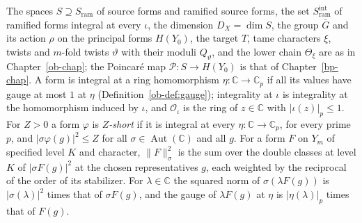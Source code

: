 \documentclass[reqno]{amsart}
\newcounter{chap}
\theoremstyle{definition}
\theoremstyle{plain}
\theoremstyle{definition}
\newcommand{\C}{\mathbb{C}}
\newcommand{\Sram}{S_{\mathrm{ram}}}
\newcommand{\Oc}{\mathcal{O}}
\newcommand{\Gb}{\bar G}
\newcommand{\Aut}{\operatorname{Aut}}
\begin{document}
The spaces \(S \supseteq \Sram\) of source forms and ramified source forms, the set \(\Sram^{\mathrm{int}}\) of ramified forms integral at every \(\iota\), the dimension \(D_X = \dim S\), the group \(\Gb\) and its action \(\rho\) on the principal forms \(H(Y_0)\), the target \(T\), tame characters \(\xi\), twists and \(m\)-fold twists \(\vartheta\) with their moduli \(Q_\vartheta\), and the lower chain \(\Theta_\xi\) are as in Chapter~\ref{ob-chap}; the Poincar\'e map \(\mathcal{P}\colon S \to H(Y_0)\) is that of Chapter~\ref{bp-chap}.  A form is integral at a ring homomorphism \(\eta\colon \C \to \C_p\) if all its values have gauge at most \(1\) at \(\eta\) (Definition~\ref{ob-def:gauge}); integrality at \(\iota\) is integrality at the homomorphism induced by \(\iota\), and \(\Oc_\iota\) is the ring of \(z \in \C\) with \(\lvert\iota(z)\rvert_p \le 1\).  For \(Z > 0\) a form \(\varphi\) is \emph{\(Z\)-short} if it is integral at every \(\eta\colon \C \to \C_p\), for every prime \(p\), and \(\lvert\sigma\varphi(g)\rvert^2 \le Z\) for all \(\sigma \in \Aut(\C)\) and all \(g\).  For a form \(F\) on \(Y_m\) of specified level \(K\) and character, \(\lVert F\rVert_\sigma^2\) is the sum over the double classes at level \(K\) of \(\lvert\sigma F(g)\rvert^2\) at the chosen representatives \(g\), each weighted by the reciprocal of the order of its stabilizer.  For \(\lambda \in \C\) the squared norm of \(\sigma(\lambda F(g))\) is \(\lvert\sigma(\lambda)\rvert^2\) times that of \(\sigma F(g)\), and the gauge of \(\lambda F(g)\) at \(\eta\) is \(\lvert\eta(\lambda)\rvert_p\) times that of \(F(g)\).
\end{document}
